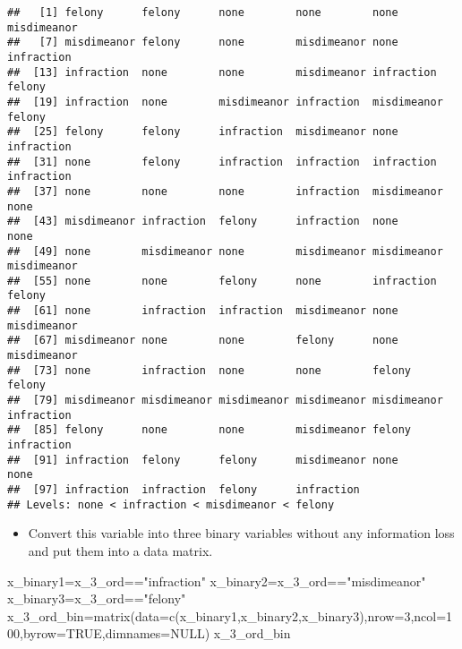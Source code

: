 \documentclass[
]{article}
\newenvironment{Shaded}{\begin{snugshade}}{\end{snugshade}}
\newcommand{\AttributeTok}[1]{\textcolor[rgb]{0.77,0.63,0.00}{#1}}
\newcommand{\ConstantTok}[1]{\textcolor[rgb]{0.00,0.00,0.00}{#1}}
\newcommand{\DecValTok}[1]{\textcolor[rgb]{0.00,0.00,0.81}{#1}}
\newcommand{\FunctionTok}[1]{\textcolor[rgb]{0.00,0.00,0.00}{#1}}
\newcommand{\NormalTok}[1]{#1}
\newcommand{\OtherTok}[1]{\textcolor[rgb]{0.56,0.35,0.01}{#1}}
\newcommand{\SpecialCharTok}[1]{\textcolor[rgb]{0.00,0.00,0.00}{#1}}
\newcommand{\StringTok}[1]{\textcolor[rgb]{0.31,0.60,0.02}{#1}}
\providecommand{\tightlist}{%
  \setlength{\itemsep}{0pt}\setlength{\parskip}{0pt}}
\begin{document}
\begin{verbatim}
##   [1] felony      felony      none        none        none        misdimeanor
##   [7] misdimeanor felony      none        misdimeanor none        infraction 
##  [13] infraction  none        none        misdimeanor infraction  felony     
##  [19] infraction  none        misdimeanor infraction  misdimeanor felony     
##  [25] felony      felony      infraction  misdimeanor none        infraction 
##  [31] none        felony      infraction  infraction  infraction  infraction 
##  [37] none        none        none        infraction  misdimeanor none       
##  [43] misdimeanor infraction  felony      infraction  none        none       
##  [49] none        misdimeanor none        misdimeanor misdimeanor misdimeanor
##  [55] none        none        felony      none        infraction  felony     
##  [61] none        infraction  infraction  misdimeanor none        misdimeanor
##  [67] misdimeanor none        none        felony      none        misdimeanor
##  [73] none        infraction  none        none        felony      felony     
##  [79] misdimeanor misdimeanor misdimeanor misdimeanor misdimeanor infraction 
##  [85] felony      none        none        misdimeanor felony      infraction 
##  [91] infraction  felony      felony      misdimeanor none        none       
##  [97] infraction  infraction  felony      infraction 
## Levels: none < infraction < misdimeanor < felony
\end{verbatim}

\begin{itemize}
\tightlist
\item
  Convert this variable into three binary variables without any
  information loss and put them into a data matrix.
\end{itemize}

\begin{Shaded}
\begin{Highlighting}[]
\NormalTok{x\_binary1}\OtherTok{=}\NormalTok{x\_3\_ord}\SpecialCharTok{==}\StringTok{"infraction"}
\NormalTok{x\_binary2}\OtherTok{=}\NormalTok{x\_3\_ord}\SpecialCharTok{==}\StringTok{"misdimeanor"}
\NormalTok{x\_binary3}\OtherTok{=}\NormalTok{x\_3\_ord}\SpecialCharTok{==}\StringTok{"felony"}
\NormalTok{x\_3\_ord\_bin}\OtherTok{=}\FunctionTok{matrix}\NormalTok{(}\AttributeTok{data=}\FunctionTok{c}\NormalTok{(x\_binary1,x\_binary2,x\_binary3),}\AttributeTok{nrow=}\DecValTok{3}\NormalTok{,}\AttributeTok{ncol=}\DecValTok{100}\NormalTok{,}\AttributeTok{byrow=}\ConstantTok{TRUE}\NormalTok{,}\AttributeTok{dimnames=}\ConstantTok{NULL}\NormalTok{)}
\NormalTok{x\_3\_ord\_bin}
\end{Highlighting}
\end{Shaded}
\end{document}

